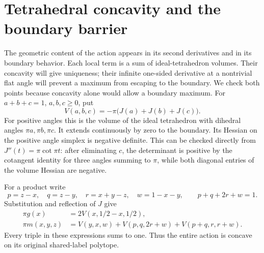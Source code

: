 \section{Tetrahedral concavity and the boundary barrier}

The geometric content of the action appears in its second derivatives and in its boundary behavior. Each local term is a sum of ideal-tetrahedron volumes. Their concavity will give uniqueness; their infinite one-sided derivative at a nontrivial flat angle will prevent a maximum from escaping to the boundary. We check both points because concavity alone would allow a boundary maximum.
For $a+b+c=1$, $a,b,c\ge0$, put
\[
 V(a,b,c)=-\pi\bigl(J(a)+J(b)+J(c)\bigr).
\]
For positive angles this is the volume of the ideal tetrahedron with dihedral angles $\pi a,\pi b,\pi c$. It extends continuously by zero to the boundary. Its Hessian on the positive angle simplex is negative definite. This can be checked directly from $J''(t)=\pi\cot\pi t$: after eliminating $c$, the determinant is positive by the cotangent identity for three angles summing to $\pi$, while both diagonal entries of the volume Hessian are negative.

For a product write
\[
 p=z-x,\quad q=z-y,\quad r=x+y-z,\quad w=1-x-y,
 \qquad p+q+2r+w=1.
\]
Substitution and reflection of $J$ give
\begin{align}
 \pi g(x)&=2V(x,1/2-x,1/2),\label{eq:leaf-atoms}\\
 \pi m(x,y,z)&=V(y,x,w)+V(p,q,2r+w)
                  +V(p+q,r,r+w).\label{eq:gate-atoms}
\end{align}
Every triple in these expressions sums to one. Thus the entire action is concave on its original shared-label polytope.

